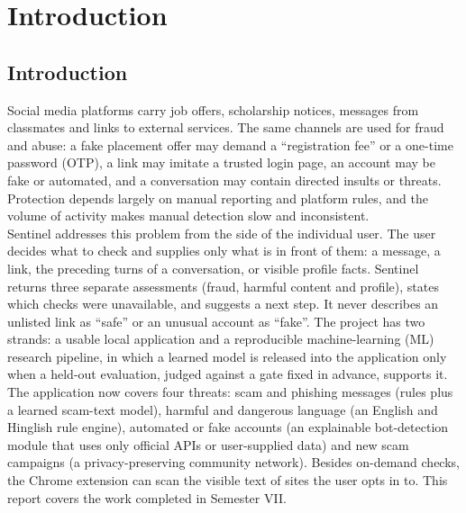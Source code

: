 \onehalfspacing

\pagestyle{fancy}
\fancyhf{}
\renewcommand{\headrulewidth}{0pt}
\cfoot{\thepage}
\chapter{Introduction}

\section{Introduction}
\noindent Social media platforms carry job offers, scholarship notices, messages from classmates and links to external services. The same channels are used for fraud and abuse: a fake placement offer may demand a ``registration fee'' or a one-time password (OTP), a link may imitate a trusted login page, an account may be fake or automated, and a conversation may contain directed insults or threats. Protection depends largely on manual reporting and platform rules, and the volume of activity makes manual detection slow and inconsistent.\\

\noindent Sentinel addresses this problem from the side of the individual user. The user decides what to check and supplies only what is in front of them: a message, a link, the preceding turns of a conversation, or visible profile facts. Sentinel returns three separate assessments (fraud, harmful content and profile), states which checks were unavailable, and suggests a next step. It never describes an unlisted link as ``safe'' or an unusual account as ``fake''. The project has two strands: a usable local application and a reproducible machine-learning (ML) research pipeline, in which a learned model is released into the application only when a held-out evaluation, judged against a gate fixed in advance, supports it. The application now covers four threats: scam and phishing messages (rules plus a learned scam-text model), harmful and dangerous language (an English and Hinglish rule engine), automated or fake accounts (an explainable bot-detection module that uses only official APIs or user-supplied data) and new scam campaigns (a privacy-preserving community network). Besides on-demand checks, the Chrome extension can scan the visible text of sites the user opts in to. This report covers the work completed in Semester VII.

